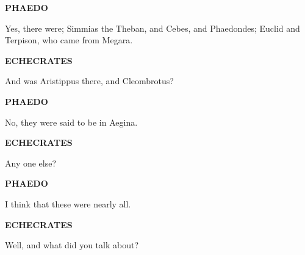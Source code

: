 \documentclass[11pt,letter]{article}
\begin{document}
\par \textbf{PHAEDO}
\par   Yes, there were; Simmias the Theban, and Cebes, and Phaedondes; Euclid and Terpison, who came from Megara.

\par \textbf{ECHECRATES}
\par   And was Aristippus there, and Cleombrotus?

\par \textbf{PHAEDO}
\par   No, they were said to be in Aegina.

\par \textbf{ECHECRATES}
\par   Any one else?

\par \textbf{PHAEDO}
\par   I think that these were nearly all.

\par \textbf{ECHECRATES}
\par   Well, and what did you talk about?
\end{document}
